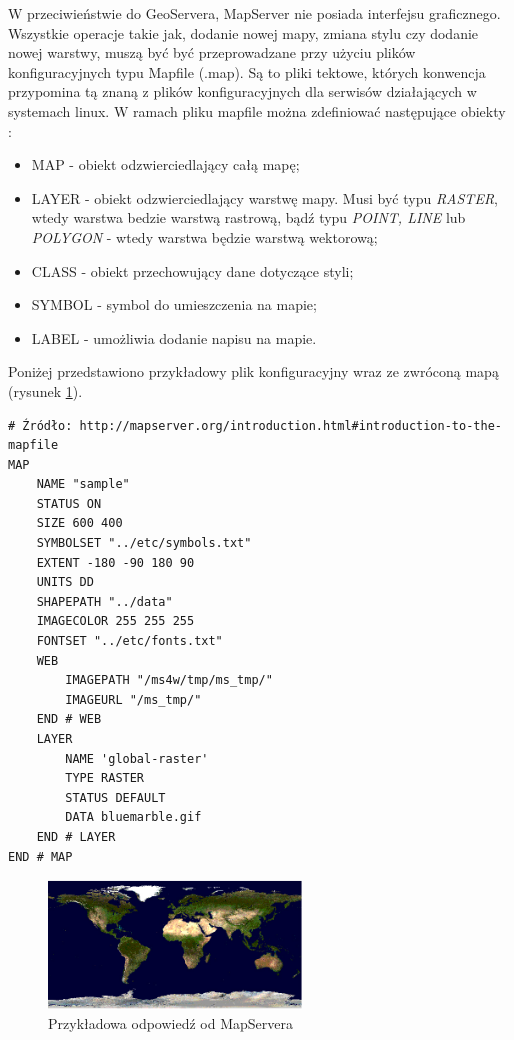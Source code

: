 W przeciwieństwie do GeoServera, MapServer nie posiada interfejsu graficznego. Wszystkie operacje takie jak,
dodanie nowej mapy, zmiana stylu czy dodanie nowej warstwy, muszą być być przeprowadzane przy użyciu plików
konfiguracyjnych typu Mapfile (.map). Są to pliki tektowe, których konwencja przypomina tą znaną z plików
konfiguracyjnych dla serwisów działających w systemach linux. W ramach pliku mapfile można zdefiniować następujące
obiekty \cite{MapServer2011}:
\begin{itemize}
    \item MAP - obiekt odzwierciedlający całą mapę;
    \item LAYER - obiekt odzwierciedlający warstwę mapy. Musi być typu \textit{RASTER}, wtedy warstwa bedzie warstwą rastrową,
        bądź typu \textit{POINT, LINE} lub \textit{POLYGON} - wtedy warstwa będzie warstwą wektorową;
    \item CLASS - obiekt przechowujący dane dotyczące styli;
    \item SYMBOL - symbol do umieszczenia na mapie;
    \item LABEL - umożliwia dodanie napisu na mapie.
\end{itemize}

Poniżej przedstawiono przykładowy plik konfiguracyjny wraz ze zwróconą mapą (rysunek \ref{fig:mapserver_config}).

\begin{lstlisting}[frame=L]
# Źródło: http://mapserver.org/introduction.html#introduction-to-the-mapfile
MAP
    NAME "sample"
    STATUS ON
    SIZE 600 400
    SYMBOLSET "../etc/symbols.txt"
    EXTENT -180 -90 180 90
    UNITS DD
    SHAPEPATH "../data"
    IMAGECOLOR 255 255 255
    FONTSET "../etc/fonts.txt"
    WEB
        IMAGEPATH "/ms4w/tmp/ms_tmp/"
        IMAGEURL "/ms_tmp/"
    END # WEB
    LAYER
        NAME 'global-raster'
        TYPE RASTER
        STATUS DEFAULT
        DATA bluemarble.gif
    END # LAYER
END # MAP
\end{lstlisting}

\begin{figure}[h!]
    \centering
    \includegraphics[width=0.6\textwidth]{img/mapserver_config.jpg}
    \caption{Przykładowa odpowiedź od MapServera}
    \label{fig:mapserver_config}
\end{figure}

